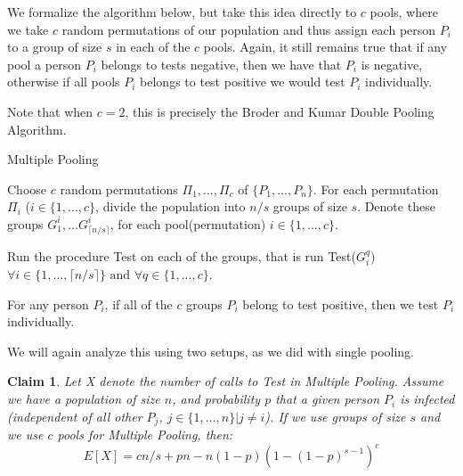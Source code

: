 \documentclass[12pt]{article}
\newtheorem{claim}[theorem]{Claim}
\begin{document}
We formalize the algorithm below, but take this idea directly to $c$ pools, where we take $c$ random permutations of our population and thus assign each person $P_i$ to a group of size $s$ in each of the $c$ pools. Again, it still remains true that if any pool a person $P_i$ belongs to tests negative, then we have that $P_i$ is negative, otherwise if all pools $P_i$ belongs to test positive we would test $P_i$ individually.

Note that when $c=2$, this is precisely the Broder and Kumar Double Pooling Algorithm.

\LinesNumbered
\begin{algorithm}[ht]
  \caption{Multiple Pooling\label{alg}}
  Choose $c$ random permutations $\Pi_1,...,\Pi_c$ of $\{P_1,...,P_n\}$.
  For each permutation $\Pi_i$ (\forall $i \in \{1,...,c\}$, divide the population into $n/s$ groups of size $s$. Denote these groups $G^i_1,...G^i_{\lceil n/s \rceil}$, for each pool(permutation) $i \in \{1,...,c\}$.
  
  Run the procedure {\sf Test} on each of the groups, that is run Test($G^q_i$) $\forall i \in \{1,...,{\lceil n/s \rceil}\} \mbox{ and } \forall q \in \{1,...,c\}$.
  
  For any person $P_i$, if all of the $c$ groups $P_i$ belong to test positive, then we test $P_i$ individually.
 
\end{algorithm}

We will again analyze this using two setups, as we did with single pooling.


\begin{claim}
Let X denote the number of calls to {\sf Test} in Multiple Pooling. Assume we have a population of size $n$, and probability $p$ that a given person $P_i$ is infected (independent of all other $P_j$, \forall $j \in \{1,...,n\} | j \not= i$). If we use groups of size $s$ and we use $c$ pools for Multiple Pooling, then: $$E[X]= cn/s + pn - n(1-p)(1-(1-p)^{s-1})^c$$

\end{claim}
\end{document}

